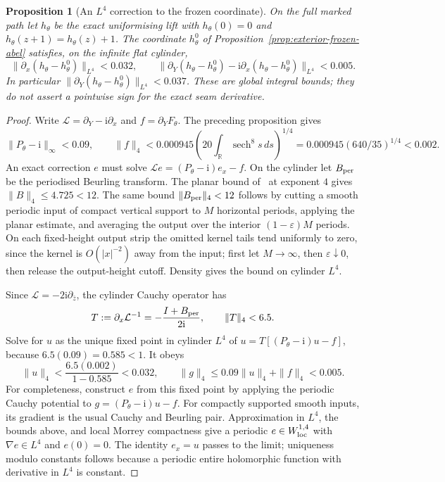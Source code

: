 \documentclass[11pt]{amsart}
\newtheorem{proposition}[theorem]{Proposition}
\theoremstyle{definition}
\newcommand{\ii}{\mathrm{i}}
\begin{document}
\begin{proposition}[An $L^4$ correction to the frozen coordinate]
\label{prop:exterior-frozen-correction}
On the full marked path let $h_\theta$ be the exact uniformising
lift with $h_\theta(0)=0$ and
$h_\theta(z+1)=h_\theta(z)+1$.  The coordinate $h^0_\theta$
of Proposition~\ref{prop:exterior-frozen-abel} satisfies, on the
infinite flat cylinder,
\[
 \|\partial_x(h_\theta-h^0_\theta)\|_{L^4}<0.032,
 \qquad
 \|\partial_Y(h_\theta-h^0_\theta)
       -\ii\partial_x(h_\theta-h^0_\theta)\|_{L^4}<0.005.
\]
In particular
$\|\partial_Y(h_\theta-h^0_\theta)\|_{L^4}<0.037$.
These are global integral bounds; they do not assert a pointwise
sign for the exact seam derivative.
\end{proposition}

\begin{proof}
Write $\mathcal L=\partial_Y-\ii\partial_x$ and
$f=\partial_YF_\theta$.  The preceding proposition gives
\[
 \|P_\theta-\ii\|_\infty<0.09,
 \qquad
 \|f\|_4<0.000945
       \left(20\int_{\mathbb R}\!\operatorname{sech}^8s\,ds\right)^{1/4}
       =0.000945(640/35)^{1/4}<0.002.
\]
An exact correction $e$ must solve
$\mathcal Le=(P_\theta-\ii)e_x-f$.
On the cylinder let $B_{\rm per}$ be the periodised Beurling
transform.  The planar bound of~\cite[Thm.~1.2]{BanuelosJanakiraman}
at exponent $4$ gives $\|B\|_4\le4.725<12$.
The same bound $\|B_{\rm per}\|_4<12$ follows by cutting a smooth
periodic input of compact vertical support to $M$ horizontal periods,
applying the planar estimate, and averaging the output over the
interior $(1-\varepsilon)M$ periods.  On each fixed-height output
strip the omitted kernel tails tend uniformly to zero, since the
kernel is $O(|x|^{-2})$ away from the input; first let $M\to\infty$,
then $\varepsilon\downarrow0$, then release the output-height cutoff.
Density gives the bound on cylinder $L^4$.

Since $\mathcal L=-2\ii\partial_{\bar z}$, the cylinder
Cauchy operator has
\[
 T:=\partial_x\mathcal L^{-1}
   =-\frac{I+B_{\rm per}}{2\ii},
 \qquad \|T\|_4<6.5.
\]
Solve for $u$ as the unique fixed point in cylinder $L^4$ of
$u=T[(P_\theta-\ii)u-f]$, because $6.5(0.09)=0.585<1$.
It obeys
\[
 \|u\|_4<\frac{6.5(0.002)}{1-0.585}<0.032,
 \qquad
 \|g\|_4
 \le0.09\|u\|_4+\|f\|_4<0.005.
\]
For completeness, construct $e$ from this fixed point by applying
the periodic Cauchy potential to
$g=(P_\theta-\ii)u-f$.  For compactly supported smooth inputs,
its gradient is the usual Cauchy and Beurling pair.  Approximation
in $L^4$, the bounds above, and local Morrey compactness give a
periodic $e\in W^{1,4}_{\rm loc}$ with $\nabla e\in L^4$ and
$e(0)=0$.  The identity $e_x=u$ passes to the limit; uniqueness
modulo constants follows because a periodic entire holomorphic
function with derivative in $L^4$ is constant.


\end{proof}
\end{document}
